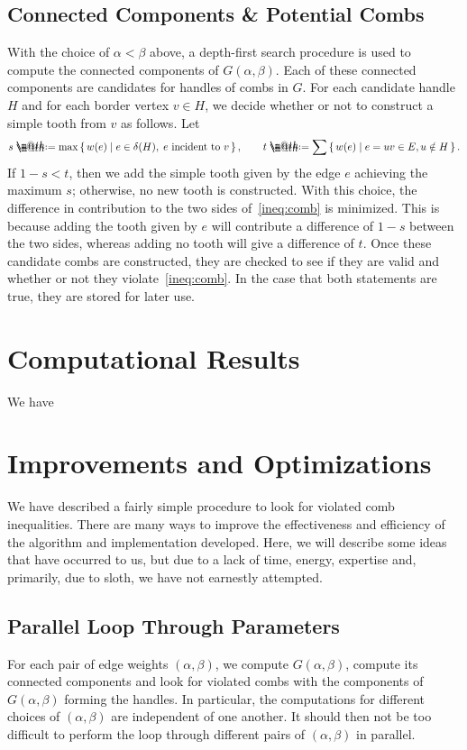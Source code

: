 \documentclass[11pt, letterpaper]{amsart}
\makeatletter
\theoremstyle{plain}
\theoremstyle{definition}
\theoremstyle{remark}
\newcommand*{\coloneqq}{\mathrel{\rlap{%
           \raisebox{0.3ex}{$\m@th\cdot$}}%
           \raisebox{-0.3ex}{$\m@th\cdot$}}%
           =}
\makeatother
\begin{document}
\subsection{Connected Components \& Potential Combs}
With the choice of $\alpha < \beta$ above, a depth-first search procedure is
used to compute the connected components of $G(\alpha,\beta)$. Each of these
connected components are candidates for handles of combs in $G$. For each
candidate handle $H$ and for each border vertex $v \in H$, we decide whether or
not to construct a simple tooth from $v$ as follows. Let
\begin{align*}
  s \coloneqq \max\set{w(e) | e \in \delta(H), \;\text{$e$ incident to $v$}}, \qquad t \coloneqq \sum \set{w(e) | e = uv \in E, u \notin H}.
\end{align*}
If $1 - s < t$, then we add the simple tooth given by the edge $e$ achieving
the maximum $s$; otherwise, no new tooth is constructed. With this choice, the
difference in contribution to the two sides of~\eqref{ineq:comb} is minimized.
This is because adding the tooth given by $e$ will contribute a difference of
$1 - s$ between the two sides, whereas adding no tooth will give a difference
of $t$. Once these candidate combs are constructed, they are checked to see if
they are valid and whether or not they violate~\eqref{ineq:comb}. In the case that
both statements are true, they are stored for later use.

\section{Computational Results}\label{sec:computations}
We have

\section{Improvements and Optimizations}\label{sec:opt}
We have described a fairly simple procedure to look for violated comb
inequalities. There are many ways to improve the effectiveness and efficiency
of the algorithm and implementation developed. Here, we will describe some
ideas that have occurred to us, but due to a lack of time, energy, expertise
and, primarily, due to sloth, we have not earnestly attempted.

\subsection{Parallel Loop Through Parameters}
For each pair of edge weights $(\alpha, \beta)$, we compute $G(\alpha,\beta)$,
compute its connected components and look for violated combs with the
components of $G(\alpha,\beta)$ forming the handles. In particular, the
computations for different choices of $(\alpha, \beta)$ are independent of one
another. It should then not be too difficult to perform the loop through
different pairs of $(\alpha,\beta)$ in parallel.
\end{document}
